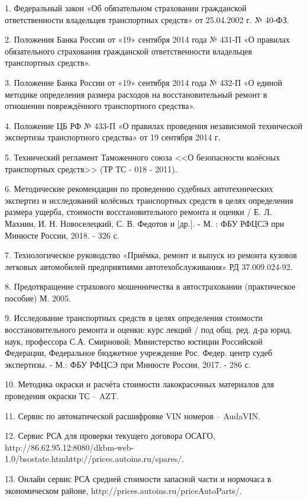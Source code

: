 1. Федеральный закон «Об обязательном страховании гражданской ответственности владельцев транспортных средств» от 25.04.2002 г. № 40-ФЗ.

2. Положения Банка России от «19» сентября 2014 года № 431-П «О правилах обязательного страхования гражданской ответственности владельцев транспортных средств».

3. Положение Банка России от «19» сентября 2014 года № 432-П «О единой методике определения размера расходов на восстановительный ремонт в отношении повреждённого транспортного средства».

4. Положение ЦБ РФ № 433-П «О правилах проведения независимой технической экспертизы транспортного средства» от 19 сентября 2014 г.

5. Технический регламент Таможенного союза <<О безопасности колёсных транспортных средств>> (ТР ТС - 018 - 2011).

6. Методические рекомендации по проведению судебных автотехнических экспертиз и исследований колёсных транспортных средств в целях определения размера ущерба, стоимости восстановительного ремонта и оценки / Е. Л. Махнин, И. Н. Новоселецкий, С. В. Федотов и [др.]. - М. : ФБУ РФЦСЭ при Минюсте  России, 2018. - 326 с.

7. Технологическое руководство «Приёмка, ремонт и выпуск из ремонта кузовов легковых автомобилей предприятиями автотехобслуживания» РД 37.009.024-92.

8. Предотвращение страхового мошенничества в автостраховании  (практическое  пособие)  М.  2005.

9. Исследование транспортных средств в целях определения стоимости восстановительного ремонта и оценки: курс лекций / под общ. ред. д-ра юрид. наук, профессора С.А. Смирновой; Министерство юстиции Российской Федерации, Федеральное бюджетное учреждение Рос. Федер. центр судеб экспертизы. - М.: ФБУ РФЦСЭ при Минюсте России, 2017. - 286 с.

10. Методика окраски и расчёта стоимости лакокрасочных материалов для проведения окраски ТС – AZT. 

11. Сервис по автоматической расшифровке VIN номеров – AudaVIN.

12. Сервис РСА для проверки текущего договора ОСАГО,  http://86.62.95.12:8080/dkbm-web-1.0/bsostate.htmhttp://prices.autoins.ru/spares/.

13. Онлайн сервис РСА средней стоимости запасной части и нормочаса в экономическом районе,    http://prices.autoins.ru/priceAutoParts/.

